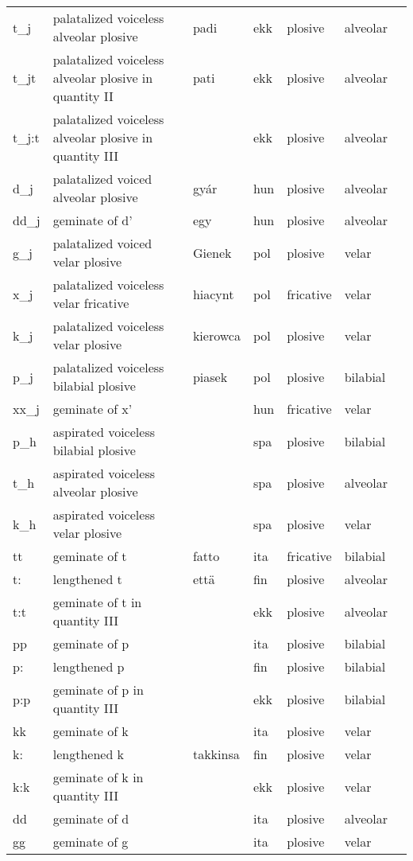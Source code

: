 \begin{longtable}{l|p{.3\linewidth}|p{.15\linewidth}|l|l|l|l}
	t\_j	& palatalized voiceless alveolar plosive	& padi	& ekk	& plosive	& alveolar	\\
	t\_jt	& palatalized voiceless alveolar plosive in quantity II	& pati	& ekk	& plosive	& alveolar	\\
	t\_j:t	& palatalized voiceless alveolar plosive in quantity III	& 	& ekk	& plosive	& alveolar	\\
	d\_j	& palatalized voiced alveolar plosive	& gyár	& hun	& plosive	& alveolar	\\
	dd\_j	& geminate of d'	& egy	& hun	& plosive	& alveolar	\\
	g\_j	& palatalized voiced velar plosive	& Gienek	& pol	& plosive	& velar	\\
	x\_j	& palatalized voiceless velar fricative	& hiacynt	& pol	& fricative	& velar	\\
	k\_j	& palatalized voiceless velar plosive	& kierowca	& pol	& plosive	& velar	\\
	p\_j	& palatalized voiceless bilabial plosive	& piasek	& pol	& plosive	& bilabial	\\
	xx\_j	& geminate of x'	& 	& hun	& fricative	& velar	\\
	p\_h	& aspirated voiceless bilabial plosive	& 	& spa	& plosive	& bilabial	\\
	t\_h	& aspirated voiceless alveolar plosive	& 	& spa	& plosive	& alveolar	\\
	k\_h	& aspirated voiceless velar plosive	& 	& spa	& plosive	& velar	\\
	tt	& geminate of t	& fatto	& ita	& fricative	& bilabial	\\
	t:	& lengthened t	& että	& fin	& plosive	& alveolar	\\
	t:t	& geminate of t in quantity III	& 	& ekk	& plosive	& alveolar	\\
	pp	& geminate of p	& 	& ita	& plosive	& bilabial	\\
	p:	& lengthened p	& 	& fin	& plosive	& bilabial	\\
	p:p	& geminate of p in quantity III	& 	& ekk	& plosive	& bilabial	\\
	kk	& geminate of k	& 	& ita	& plosive	& velar	\\
	k:	& lengthened k	& takkinsa	& fin	& plosive	& velar	\\
	k:k	& geminate of k in quantity III	& 	& ekk	& plosive	& velar	\\
	dd	& geminate of d	& 	& ita	& plosive	& alveolar	\\
	gg	& geminate of g	& 	& ita	& plosive	& velar	\\

\end{longtable}
